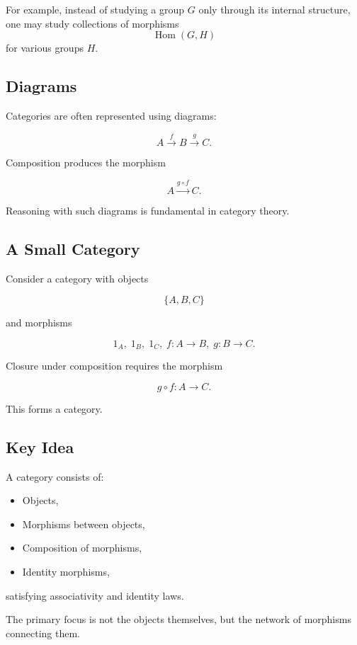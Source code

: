 For example, instead of studying a group $G$ only through its internal structure, one may study collections of morphisms
\[
\operatorname{Hom}(G,H)
\]
for various groups $H$.

\subsection{Diagrams}

Categories are often represented using diagrams:

\[
A \xrightarrow{f} B \xrightarrow{g} C.
\]

Composition produces the morphism

\[
A \xrightarrow{g\circ f} C.
\]

Reasoning with such diagrams is fundamental in category theory.

\subsection{A Small Category}

Consider a category with objects

\[
\{A,B,C\}
\]

and morphisms

\[
1_A,\;1_B,\;1_C,\;f:A\to B,\;g:B\to C.
\]

Closure under composition requires the morphism

\[
g\circ f:A\to C.
\]

This forms a category.

\subsection{Key Idea}

A category consists of:

\begin{itemize}
    \item Objects,
    \item Morphisms between objects,
    \item Composition of morphisms,
    \item Identity morphisms,
\end{itemize}

satisfying associativity and identity laws.

The primary focus is not the objects themselves, but the network of morphisms connecting them.